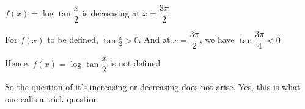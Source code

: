 \documentclass[14pt,fleqn]{extarticle}
\newcommand\fx{\log \tan \dfrac{x}{2}}
\begin{document}
 
\begin{snippet}
    
    \incorrect
    
    $f(x) = \fx$ is decreasing at $x=\dfrac{3\pi}{2}$
    
    
    \reason
    
    For $f(x)$ to be defined, $\tan \frac{x}{2} > 0$. And at $x=\dfrac{3\pi}{2}$, we have $\tan\dfrac{3\pi}{4} < 0$\newline 
    
    Hence, $f(x) = \fx$ is not defined \newline 
    
    So the question of it's increasing or decreasing does not 
    arise. Yes, this is what one calls a trick question \newline 

    
    
\end{snippet} 
\end{document}
